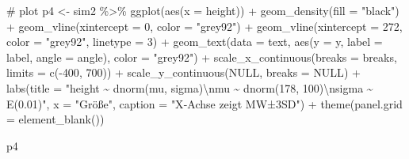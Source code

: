 \documentclass[
  a4paper,
  DIV=11]{scrreprt}
\newenvironment{Shaded}{\begin{snugshade}}{\end{snugshade}}
\newcommand{\AttributeTok}[1]{\textcolor[rgb]{0.40,0.45,0.13}{#1}}
\newcommand{\CommentTok}[1]{\textcolor[rgb]{0.37,0.37,0.37}{#1}}
\newcommand{\ConstantTok}[1]{\textcolor[rgb]{0.56,0.35,0.01}{#1}}
\newcommand{\DecValTok}[1]{\textcolor[rgb]{0.68,0.00,0.00}{#1}}
\newcommand{\FunctionTok}[1]{\textcolor[rgb]{0.28,0.35,0.67}{#1}}
\newcommand{\NormalTok}[1]{\textcolor[rgb]{0.00,0.23,0.31}{#1}}
\newcommand{\OtherTok}[1]{\textcolor[rgb]{0.00,0.23,0.31}{#1}}
\newcommand{\SpecialCharTok}[1]{\textcolor[rgb]{0.37,0.37,0.37}{#1}}
\newcommand{\StringTok}[1]{\textcolor[rgb]{0.13,0.47,0.30}{#1}}
\theoremstyle{definition}
\theoremstyle{remark}
\begin{document}
\begin{Shaded}
\begin{Highlighting}[]
\CommentTok{\# plot}
\NormalTok{p4 }\OtherTok{\textless{}{-}}
\NormalTok{  sim2 }\SpecialCharTok{\%\textgreater{}\%} 
  \FunctionTok{ggplot}\NormalTok{(}\FunctionTok{aes}\NormalTok{(}\AttributeTok{x =}\NormalTok{ height)) }\SpecialCharTok{+}
  \FunctionTok{geom\_density}\NormalTok{(}\AttributeTok{fill =} \StringTok{"black"}\NormalTok{) }\SpecialCharTok{+}
  \FunctionTok{geom\_vline}\NormalTok{(}\AttributeTok{xintercept =} \DecValTok{0}\NormalTok{, }\AttributeTok{color =} \StringTok{"grey92"}\NormalTok{) }\SpecialCharTok{+}
  \FunctionTok{geom\_vline}\NormalTok{(}\AttributeTok{xintercept =} \DecValTok{272}\NormalTok{, }\AttributeTok{color =} \StringTok{"grey92"}\NormalTok{, }\AttributeTok{linetype =} \DecValTok{3}\NormalTok{) }\SpecialCharTok{+}
  \FunctionTok{geom\_text}\NormalTok{(}\AttributeTok{data =}\NormalTok{ text,}
            \FunctionTok{aes}\NormalTok{(}\AttributeTok{y =}\NormalTok{ y, }\AttributeTok{label =}\NormalTok{ label, }\AttributeTok{angle =}\NormalTok{ angle),}
            \AttributeTok{color =} \StringTok{"grey92"}\NormalTok{) }\SpecialCharTok{+}
  \FunctionTok{scale\_x\_continuous}\NormalTok{(}\AttributeTok{breaks =}\NormalTok{ breaks, }
                     \AttributeTok{limits =} \FunctionTok{c}\NormalTok{(}\SpecialCharTok{{-}}\DecValTok{400}\NormalTok{, }\DecValTok{700}\NormalTok{)) }\SpecialCharTok{+}
  \FunctionTok{scale\_y\_continuous}\NormalTok{(}\ConstantTok{NULL}\NormalTok{, }\AttributeTok{breaks =} \ConstantTok{NULL}\NormalTok{) }\SpecialCharTok{+}
  \FunctionTok{labs}\NormalTok{(}\AttributeTok{title =} \StringTok{"height \textasciitilde{} dnorm(mu, sigma)}\SpecialCharTok{\textbackslash{}n}\StringTok{mu \textasciitilde{} dnorm(178, 100)}\SpecialCharTok{\textbackslash{}n}\StringTok{sigma \textasciitilde{} E(0.01)"}\NormalTok{,}
       \AttributeTok{x =} \StringTok{"Größe"}\NormalTok{,}
       \AttributeTok{caption =} \StringTok{"X{-}Achse zeigt MW±3SD"}\NormalTok{) }\SpecialCharTok{+}
  \FunctionTok{theme}\NormalTok{(}\AttributeTok{panel.grid =} \FunctionTok{element\_blank}\NormalTok{()) }

\NormalTok{p4}
\end{Highlighting}
\end{Shaded}
\end{document}
